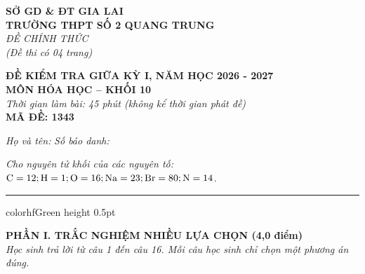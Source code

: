 \documentclass[11pt,a4paper]{article}
\begin{document}
\begin{minipage}[t]{0.48\textwidth}
\textbf{SỞ GD \& ĐT GIA LAI}\\
\textbf{TRƯỜNG THPT SỐ 2 QUANG TRUNG}\\
\textit{ĐỀ CHÍNH THỨC}\\
\textit{(Đề thi có 04 trang)}
\end{minipage}
\hfill
\begin{minipage}[t]{0.48\textwidth}
\raggedleft
\textbf{\color{hfRed}ĐỀ KIỂM TRA GIỮA KỲ I, NĂM HỌC 2026 - 2027}\\
\textbf{MÔN HÓA HỌC -- KHỐI 10}\\
\textit{Thời gian làm bài: 45 phút (không kể thời gian phát đề)}\\
\textbf{MÃ ĐỀ: 1343}
\end{minipage}

\vspace{4pt}
\noindent
\textit{Họ và tên:} \dotfill \textit{Số báo danh:} \dotfill

\vspace{3pt}
\noindent
\textit{\footnotesize Cho nguyên tử khối của các nguyên tố: $\ce{C} = 12; \ce{H} = 1; \ce{O} = 16; \ce{Na} = 23; \ce{Br} = 80; \ce{N} = 14$.}

\vspace{3pt}
\hrule color{hfGreen} height 0.5pt

\vspace{4pt}
\noindent
{\color{mainGreen}\textbf{\Large PHẦN I. TRẮC NGHIỆM NHIỀU LỰA CHỌN (4,0 điểm)}}\\
\textit{\small Học sinh trả lời từ câu 1 đến câu 16. Mỗi câu học sinh chỉ chọn một phương án đúng.}
\vspace{2pt}
\end{document}
